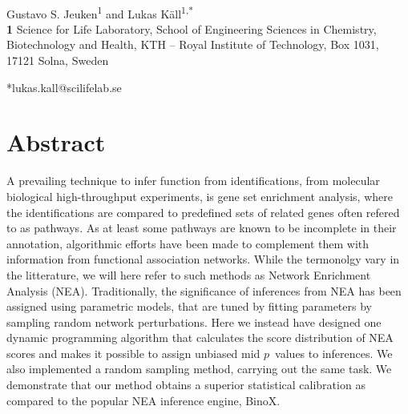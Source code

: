 \documentclass[10pt,letterpaper]{article}
\begin{document}
\vspace*{0.2in}

\begin{flushleft}
{\Large
\textbf{} %
}
\newline
\\
Gustavo S. Jeuken\textsuperscript{1} and
Lukas K\"{a}ll\textsuperscript{1,*}
\\
\bigskip
\textbf{1} Science for Life Laboratory, School of Engineering Sciences in Chemistry, Biotechnology and Health, KTH -- Royal Institute of Technology, Box 1031, 17121 Solna, Sweden
\\
\bigskip

*lukas.kall@scilifelab.se
\end{flushleft}
\section*{Abstract}
A prevailing technique to infer function from identifications, from molecular biological high-throughput experiments, is gene set enrichment analysis, where the identifications are compared to predefined sets of related genes often refered to as pathways. As at least some pathways are known to be incomplete in their annotation, algorithmic efforts have been made to complement them with information from functional association networks. While the termonolgy vary in the litterature, we will here refer to such methods as Network Enrichment Analysis (NEA). Traditionally, the significance of inferences from NEA has been assigned using parametric models, that are tuned by fitting parameters by sampling random network perturbations. Here we instead have designed one dynamic programming  algorithm that calculates the score distribution of NEA scores and makes it possible to assign unbiased mid $p$~values to inferences. We also implemented a random sampling method, carrying out the same task. We demonstrate that our method obtains a superior statistical calibration as compared to the popular NEA inference engine, BinoX.
\end{document}
